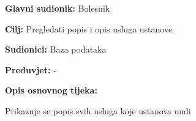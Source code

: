 				
				\noindent {}
				\begin{packed_item}
					
					\item \textbf{Glavni sudionik: }Bolesnik
					\item  \textbf{Cilj:} Pregledati popis i opis usluga ustanove
					\item  \textbf{Sudionici:} Baza podataka
					\item  \textbf{Preduvjet:} -
					\item  \textbf{Opis osnovnog tijeka:}
					
					
					\item[] \begin{packed_enum}
						
						\item Prikazuje se popis svih usluga koje ustanova nudi
						
					\end{packed_enum}
					
					
				\end{packed_item}
				

